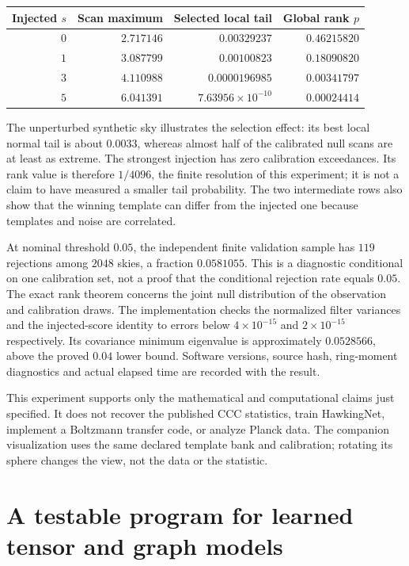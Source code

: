 \begin{center}
\small
\begin{tabular}{rrrr}
\toprule
Injected $s$ & Scan maximum & Selected local tail & Global rank $p$\\
\midrule
$0$ & $2.717146$ & $0.00329237$ & $0.46215820$\\
$1$ & $3.087799$ & $0.00100823$ & $0.18090820$\\
$3$ & $4.110988$ & $0.0000196985$ & $0.00341797$\\
$5$ & $6.041391$ & $7.63956\times10^{-10}$ & $0.00024414$\\
\bottomrule
\end{tabular}
\end{center}

The unperturbed synthetic sky illustrates the selection effect: its best
local normal tail is about $0.0033$, whereas almost half of the calibrated
null scans are at least as extreme. The strongest injection has zero
calibration exceedances. Its rank value is therefore $1/4096$, the finite
resolution of this experiment; it is not a claim to have measured a
smaller tail probability. The two intermediate rows also show that the
winning template can differ from the injected one because templates and
noise are correlated.

At nominal threshold $0.05$, the independent finite validation sample has
$119$ rejections among $2048$ skies, a fraction $0.0581055$. This is a
diagnostic conditional on one calibration set, not a proof that the
conditional rejection rate equals $0.05$. The exact rank theorem concerns
the joint null distribution of the observation and calibration draws.
The implementation checks the normalized filter variances and the
injected-score identity to errors below $4\times10^{-15}$ and
$2\times10^{-15}$ respectively. Its covariance minimum eigenvalue is
approximately $0.0528566$, above the proved $0.04$ lower bound. Software
versions, source hash, ring-moment diagnostics and actual elapsed time
are recorded with the result.

This experiment supports only the mathematical and computational claims
just specified. It does not recover the published CCC statistics, train
HawkingNet, implement a Boltzmann transfer code, or analyze Planck data.
The companion visualization uses the same declared template bank and
calibration; rotating its sphere changes the view, not the data or the
statistic.

\section{A testable program for learned tensor and graph models}

